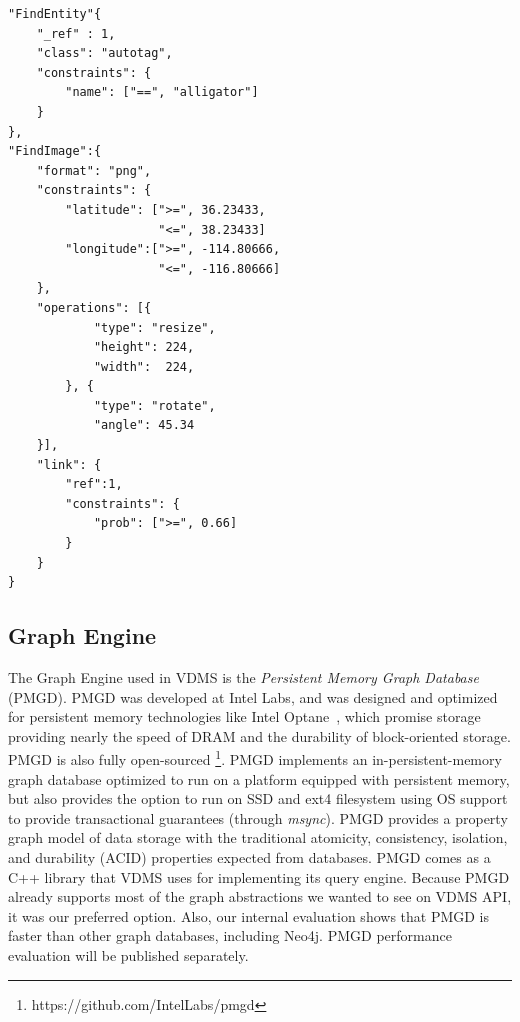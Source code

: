 \begin{listing}[ht!]
\begin{verbatim}
"FindEntity"{
    "_ref" : 1,
    "class": "autotag",
    "constraints": {
        "name": ["==", "alligator"]
    }
},
"FindImage":{
    "format": "png",
    "constraints": {
        "latitude": [">=", 36.23433,
                     "<=", 38.23433]
        "longitude":[">=", -114.80666,
                     "<=", -116.80666]
    },
    "operations": [{
            "type": "resize",
            "height": 224,
            "width":  224,
        }, {
            "type": "rotate",
            "angle": 45.34
    }],
    "link": {
        "ref":1,
        "constraints": {
            "prob": [">=", 0.66]
        }
    }
}

\end{verbatim}
\caption{Sample Query for Image Retrieval -
The query expresses the following:
Find all the images connected to the autotag \textit{alligator}
with probability higher than 0.66,
filter the images by latitude and longitude within 1 degree,
apply a resize operation to make the images 224x224,
rotate the image 45.34 degrees,
and return the images as "png" files.}
\label{findimagegeo}
\end{listing}

\subsection{Graph Engine}

The Graph Engine used in VDMS is the
\textit{Persistent Memory Graph Database} (PMGD).
PMGD was developed at Intel Labs, and was designed and optimized for
persistent memory technologies like Intel Optane~\cite{IntelXPoint15}, which
promise storage providing nearly the speed of DRAM and the
durability of block-oriented storage.
PMGD is also fully open-sourced \footnote{https://github.com/IntelLabs/pmgd}.
PMGD implements an in-persistent-memory graph database optimized
to run on a platform equipped with persistent memory, but
also provides the option to run on SSD and ext4 filesystem
using OS support to provide transactional guarantees (through \textit{msync}).
PMGD provides a property graph model of data storage with the traditional
atomicity, consistency, isolation, and durability
(ACID) properties expected from databases.
PMGD comes as a C++ library that VDMS uses for implementing its query engine.
Because PMGD already supports most of the graph abstractions we wanted
to see on VDMS API, it was our preferred option.
Also, our internal evaluation shows that PMGD is faster
than other graph databases, including Neo4j\cite{miller2013graph}.
PMGD performance evaluation will be published separately.


